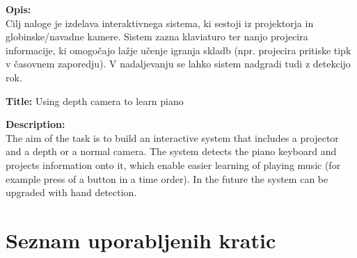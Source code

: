 \documentclass[a4paper,12pt,openright]{book}
\newcommand{\clearemptydoublepage}{\newpage{\pagestyle{empty}\cleardoublepage}}
\begin{document}
\bigskip
\noindent\textbf{Opis:}\\
Cilj naloge je izdelava interaktivnega sistema, ki sestoji iz projektorja in globinske/navadne kamere. Sistem zazna klaviaturo ter nanjo projecira informacije, ki omogočajo lažje učenje igranja skladb (npr. projecira pritiske tipk v časovnem zaporedju). V nadaljevanju se lahko sistem nadgradi tudi z detekcijo rok.

\bigskip
\noindent\textbf{Title:} Using depth camera to learn piano

\bigskip
\noindent\textbf{Description:}\\
The aim of the task is to build an interactive system that includes a projector and a depth or a normal camera. The system detects the piano keyboard and projects information onto it, which enable easier learning of playing music (for example press of a button in a time order). In the future the system can be upgraded with hand detection.

\vfill



\vspace{2cm}

\clearemptydoublepage




\clearemptydoublepage


\pagestyle{empty}
\def\thepage{}%
\tableofcontents{}


\clearemptydoublepage


\chapter*{Seznam uporabljenih kratic}
\end{document}
